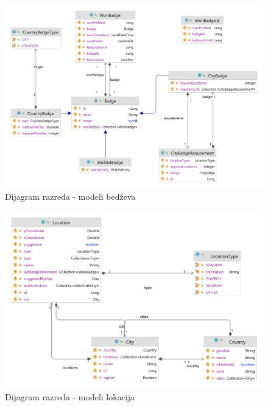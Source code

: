                 \begin{figure}[H]
        			\includegraphics[scale=0.2]{slike/class/class_model_badge.png}
        		\centering
        		\caption{Dijagram razreda - modeli bedževa}
        	\end{figure}
         
                \begin{figure}[H]
        			\includegraphics[scale=0.2]{slike/class/class_model_location.png}
        		\centering
        		\caption{Dijagram razreda - modeli lokacija}
        	\end{figure}
         
